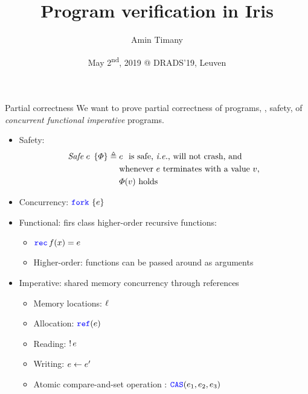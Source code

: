 \documentclass{beamer}
\begin{document}
\title{Program verification in Iris}
\author{Amin Timany}
\date{May 2\textsuperscript{nd}, 2019 @ DRADS'19, Leuven}

\frame{\titlepage}

\begin{frame}[t]{Partial correctness}
  We want to prove partial correctness of programs, \ie, safety, of \emph{concurrent functional imperative} programs.
  \begin{itemize}
  \item Safety:
    \begin{align*}
      \mathit{Safe}\;{e}\;\left\{\varPhi\right\} \triangleq{} & e ~\text{ is safe, \textit{i.e.}, will not crash, and}\\
      & \text{whenever $e$ terminates with a value $v$,}\\
      & \text{$\varPhi(v)$ holds }
    \end{align*}
  \item Concurrency: $\texttt{\color{blue} fork}\,\left\{e\right\}$
  \item Functional: firs class higher-order recursive functions:
    \begin{itemize}
    \item $\Rec f \var = \expr$
    \item Higher-order: functions can be passed around as arguments
    \end{itemize}
  \item Imperative: shared memory concurrency through references
    \begin{itemize}
    \item Memory locations: $\ell$
    \item Allocation: $\Ref(\expr)$
    \item Reading: $\mathop{!} e$
    \item Writing: $e \leftarrow e'$
    \item Atomic compare-and-set operation : $\texttt{\color{blue} CAS}(e_1, e_2, e_3)$
    \end{itemize}
  \end{itemize}
\end{frame}
\end{document}
